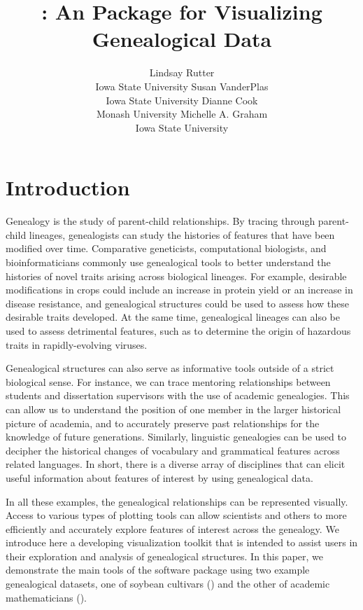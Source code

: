 \documentclass[article,shortnames]{jss}
\author{Lindsay Rutter\\Iowa State University \And 
        Susan VanderPlas\\Iowa State University \And
        Dianne Cook\\Monash University\And
        Michelle A. Graham\\Iowa State University}
\title{\pkg{ggenealogy}: An \proglang{R} Package for Visualizing Genealogical Data}
\begin{document}


\section{Introduction}

Genealogy is the study of parent-child relationships. By tracing through parent-child lineages, genealogists can study the histories of features that have been modified over time. Comparative geneticists, computational biologists, and bioinformaticians commonly use genealogical tools to better understand the histories of novel traits arising across biological lineages. For example, desirable modifications in crops could include an increase in protein yield or an increase in disease resistance, and genealogical structures could be used to assess how these desirable traits developed. At the same time, genealogical lineages can also be used to assess detrimental features, such as to determine the origin of hazardous traits in rapidly-evolving viruses.

Genealogical structures can also serve as informative tools outside of a strict biological sense. For instance, we can trace mentoring relationships between students and dissertation supervisors with the use of academic genealogies. This can allow us to understand the position of one member in the larger historical picture of academia, and to accurately preserve past relationships for the knowledge of future generations. Similarly, linguistic genealogies can be used to decipher the historical changes of vocabulary and grammatical features across related languages. In short, there is a diverse array of disciplines that can elicit useful information about features of interest by using genealogical data.

In all these examples, the genealogical relationships can be represented visually. Access to various types of plotting tools can allow scientists and others to more efficiently and accurately explore features of interest across the genealogy. We introduce here a developing visualization toolkit that is intended to assist users in their exploration and analysis of genealogical structures. In this paper, we demonstrate the main tools of the software package  using two example genealogical datasets, one of soybean cultivars (\citealt{soybean}) and the other of academic mathematicians (\citealt{mgp}).
\end{document}
